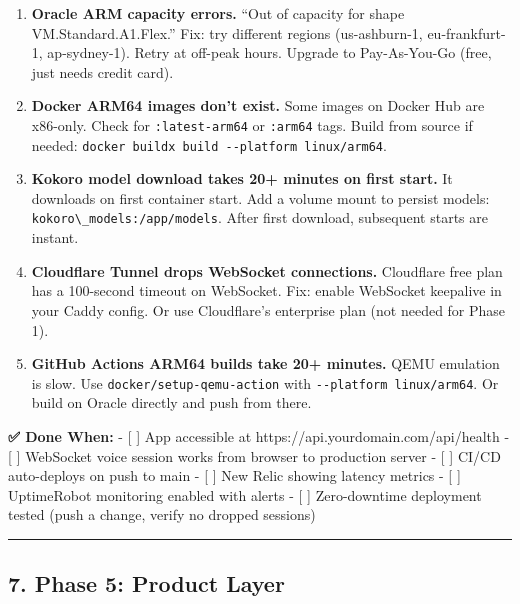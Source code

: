 \documentclass[
  11pt,
]{article}
\newcommand{\passthrough}[1]{#1}
\begin{document}
\begin{enumerate}
\def\labelenumi{\arabic{enumi}.}
\item
  \textbf{Oracle ARM capacity errors.} ``Out of capacity for shape
  VM.Standard.A1.Flex.'' Fix: try different regions (us-ashburn-1,
  eu-frankfurt-1, ap-sydney-1). Retry at off-peak hours. Upgrade to
  Pay-As-You-Go (free, just needs credit card).
\item
  \textbf{Docker ARM64 images don't exist.} Some images on Docker Hub
  are x86-only. Check for \passthrough{\lstinline!:latest-arm64!} or
  \passthrough{\lstinline!:arm64!} tags. Build from source if needed:
  \passthrough{\lstinline!docker buildx build --platform linux/arm64!}.
\item
  \textbf{Kokoro model download takes 20+ minutes on first start.} It
  downloads on first container start. Add a volume mount to persist
  models: \passthrough{\lstinline!kokoro\_models:/app/models!}. After
  first download, subsequent starts are instant.
\item
  \textbf{Cloudflare Tunnel drops WebSocket connections.} Cloudflare
  free plan has a 100-second timeout on WebSocket. Fix: enable WebSocket
  keepalive in your Caddy config. Or use Cloudflare's enterprise plan
  (not needed for Phase 1).
\item
  \textbf{GitHub Actions ARM64 builds take 20+ minutes.} QEMU emulation
  is slow. Use \passthrough{\lstinline!docker/setup-qemu-action!} with
  \passthrough{\lstinline!--platform linux/arm64!}. Or build on Oracle
  directly and push from there.
\end{enumerate}

\textbf{✅ Done When:} - {[} {]} App accessible at
https://api.yourdomain.com/api/health - {[} {]} WebSocket voice session
works from browser to production server - {[} {]} CI/CD auto-deploys on
push to main - {[} {]} New Relic showing latency metrics - {[} {]}
UptimeRobot monitoring enabled with alerts - {[} {]} Zero-downtime
deployment tested (push a change, verify no dropped sessions)

\begin{center}\rule{0.5\linewidth}{0.5pt}\end{center}

\hypertarget{phase-5-product-layer}{%
\subsection{7. Phase 5: Product Layer}\label{phase-5-product-layer}}
\end{document}
